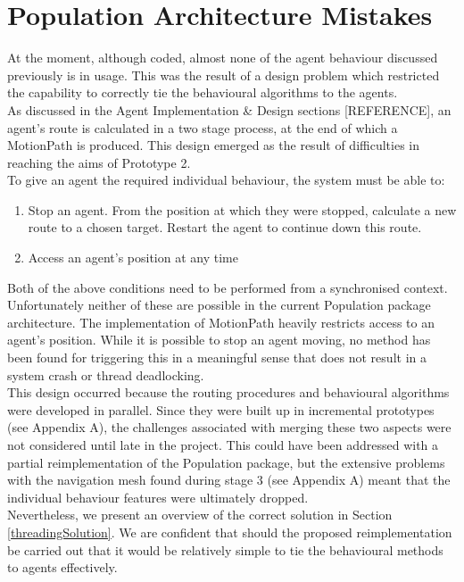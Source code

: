 \documentclass{article}
\begin{document}
\section{Population Architecture Mistakes } %
At the moment, although coded, almost none of the agent behaviour discussed previously is in usage. This was the result of a design problem which restricted the capability to correctly tie the behavioural algorithms to the agents.\\
As discussed in the Agent Implementation \& Design sections [REFERENCE], an agent's route is calculated in a two stage process, at the end of which a MotionPath is produced. This design emerged as the result of difficulties in reaching the aims of Prototype 2.\\
To give an agent the required individual behaviour, the system must be able to:
\begin{enumerate}
\item{Stop an agent. From the position at which they were stopped, calculate a new route to a chosen target. Restart the agent to continue down this route.}
\item{Access an agent's position at any time}
\end{enumerate}
Both of the above conditions need to be performed from a synchronised context. Unfortunately neither of these are possible in the current Population package architecture. The implementation of MotionPath heavily restricts access to an agent's position. While it is possible to stop an agent moving, no method has been found for triggering this in a meaningful sense that does not result in a system crash or thread deadlocking.\\
This design occurred because the routing procedures and behavioural algorithms were developed in parallel. Since they were built up in incremental prototypes (see Appendix A), the challenges associated with merging these two aspects were not considered until late in the project. This could have been addressed with a partial reimplementation of the Population package, but the extensive problems with the navigation mesh found during stage 3 (see Appendix A) meant that the individual behaviour features were ultimately dropped.\\
Nevertheless, we present an overview of the correct solution in Section \ref{threadingSolution}. We are confident that should the proposed reimplementation be carried out that it would be relatively simple to tie the behavioural methods to agents effectively.
\end{document}
